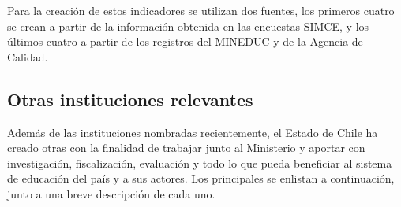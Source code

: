 \begin{description}
\begin{description}
     Para la creación de estos indicadores se utilizan dos fuentes, los primeros cuatro se crean a partir de la información obtenida en las encuestas SIMCE, y los últimos cuatro a partir de los registros del MINEDUC y de la Agencia de Calidad. 
\end{description}

\subsection{Otras instituciones relevantes}
Además de las instituciones nombradas recientemente, el Estado de Chile ha creado otras con la finalidad de trabajar junto al Ministerio y aportar con investigación, fiscalización, evaluación y todo lo que pueda beneficiar al sistema de educación del país y a sus actores. Los principales se enlistan a continuación, junto a una breve descripción de cada uno.
\newpage


\end{description}
